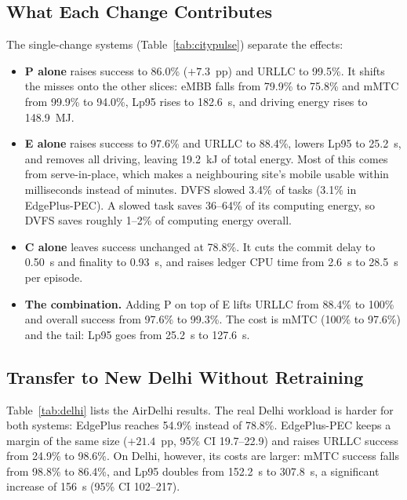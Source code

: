 \documentclass[11pt,journal,onecolumn]{IEEEtran}
\begin{document}
\subsection{What Each Change Contributes}
The single-change systems (Table~\ref{tab:citypulse}) separate the effects:
\begin{itemize}
\item \textbf{P alone} raises success to 86.0\% ($+7.3$~pp) and URLLC to 99.5\%. It shifts the misses onto the other slices: eMBB falls from 79.9\% to 75.8\% and mMTC from 99.9\% to 94.0\%, Lp95 rises to 182.6~s, and driving energy rises to 148.9~MJ.
\item \textbf{E alone} raises success to 97.6\% and URLLC to 88.4\%, lowers Lp95 to 25.2~s, and removes all driving, leaving 19.2~kJ of total energy. Most of this comes from serve-in-place, which makes a neighbouring site's mobile usable within milliseconds instead of minutes. DVFS slowed 3.4\% of tasks (3.1\% in EdgePlus-PEC). A slowed task saves 36--64\% of its computing energy, so DVFS saves roughly 1--2\% of computing energy overall.
\item \textbf{C alone} leaves success unchanged at 78.8\%. It cuts the commit delay to 0.50~s and finality to 0.93~s, and raises ledger CPU time from 2.6~s to 28.5~s per episode.
\item \textbf{The combination.} Adding P on top of E lifts URLLC from 88.4\% to 100\% and overall success from 97.6\% to 99.3\%. The cost is mMTC (100\% to 97.6\%) and the tail: Lp95 goes from 25.2~s to 127.6~s.
\end{itemize}

\subsection{Transfer to New Delhi Without Retraining}
Table~\ref{tab:delhi} lists the AirDelhi results. The real Delhi workload is harder for both systems: EdgePlus reaches 54.9\% instead of 78.8\%. EdgePlus-PEC keeps a margin of the same size ($+21.4$~pp, 95\% CI 19.7--22.9) and raises URLLC success from 24.9\% to 98.6\%. On Delhi, however, its costs are larger: mMTC success falls from 98.8\% to 86.4\%, and Lp95 doubles from 152.2~s to 307.8~s, a significant increase of 156~s (95\% CI 102--217).
\end{document}
